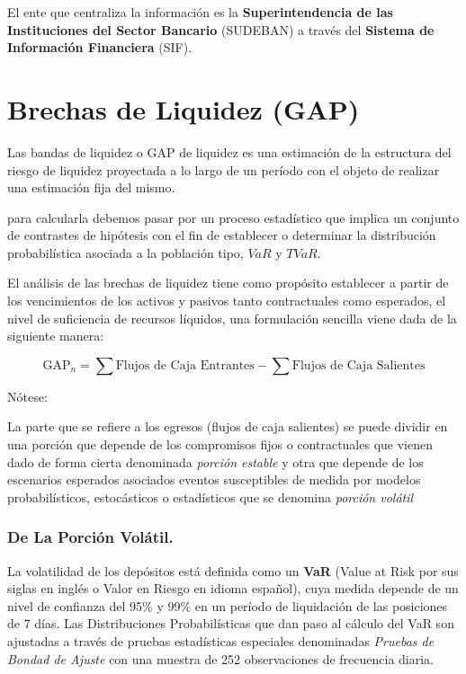 \documentclass[]{article}
\begin{document}
El ente que centraliza la información es la \textbf{Superintendencia de
las Instituciones del Sector Bancario} (SUDEBAN) a través del
\textbf{Sistema de Información Financiera} (SIF).

\hypertarget{brechas-de-liquidez-gap}{%
\section{Brechas de Liquidez (GAP)}\label{brechas-de-liquidez-gap}}

Las bandas de liquidez o GAP de liquidez es una estimación de la
estructura del riesgo de liquidez proyectada a lo largo de un período
con el objeto de realizar una estimación fija del mismo.

para calcularla debemos pasar por un proceso estadístico que implica un
conjunto de contrastes de hipótesis con el fin de establecer o
determinar la distribución probabilística asociada a la población tipo,
\(VaR\) y \(TVaR\).

El análisis de las brechas de liquidez tiene como propósito establecer a
partir de los vencimientos de los activos y pasivos tanto contractuales
como esperados, el nivel de suficiencia de recursos líquidos, una
formulación sencilla viene dada de la siguiente manera:

\[\text{GAP}_n = \sum \text{Flujos de Caja Entrantes} - \sum \text{Flujos de Caja Salientes}\]

Nótese:

La parte que se refiere a los egresos (flujos de caja salientes) se
puede dividir en una porción que depende de los compromisos fijos o
contractuales que vienen dado de forma cierta denominada \emph{porción
estable} y otra que depende de los escenarios esperados asociados
eventos susceptibles de medida por modelos probabilísticos, estocásticos
o estadísticos que se denomina \emph{porción volátil}

\hypertarget{de-la-porcion-volatil.}{%
\subsubsection{De La Porción Volátil.}\label{de-la-porcion-volatil.}}

La volatilidad de los depósitos está definida como un \textbf{VaR}
(Value at Risk por sus siglas en inglés o Valor en Riesgo en idioma
español), cuya medida depende de un nivel de confianza del 95\% y 99\%
en un período de liquidación de las posiciones de 7 días. Las
Distribuciones Probabilísticas que dan paso al cálculo del VaR son
ajustadas a través de pruebas estadísticas especiales denominadas
\emph{Pruebas de Bondad de Ajuste} con una muestra de 252 observaciones
de frecuencia diaria.
\end{document}
